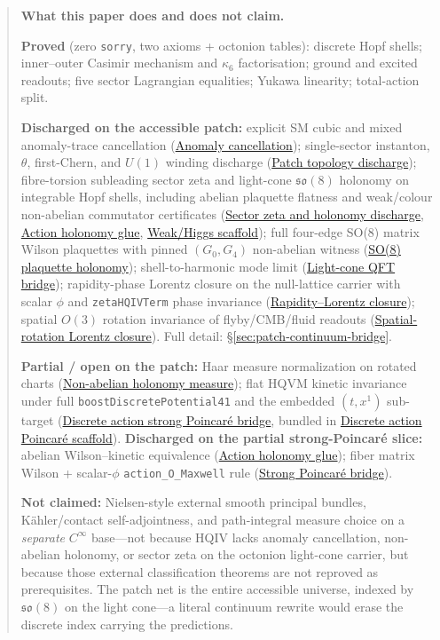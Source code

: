 \documentclass[11pt]{amsart}
\newenvironment{scopebox}{%
  \medskip\begin{quote}\small\noindent\textbf{What this paper does and does not claim.}
}{%
  \end{quote}\medskip
}
\begin{document}
\begin{scopebox}
\textbf{Proved} (zero \texttt{sorry}, two axioms + octonion tables): discrete Hopf shells; inner--outer Casimir mechanism and $\kappa_6$ factorisation; ground and excited readouts; five sector Lagrangian equalities; Yukawa linearity; total-action split.

\textbf{Discharged on the accessible patch:} explicit SM cubic and mixed anomaly-trace cancellation (\hyperref[lean:anomaly-cancellation]{Anomaly cancellation}); single-sector instanton, $\theta$, first-Chern, and $U(1)$ winding discharge (\hyperref[lean:patch-topology]{Patch topology discharge}); fibre-torsion subleading sector zeta and light-cone $\mathfrak{so}(8)$ holonomy on integrable Hopf shells, including abelian plaquette flatness and weak/colour non-abelian commutator certificates (\hyperref[lean:zeta-holonomy-discharge]{Sector zeta and holonomy discharge}, \hyperref[lean:action-holonomy-glue]{Action holonomy glue}, \hyperref[lean:weak-higgs-scaffold]{Weak/Higgs scaffold}); full four-edge SO(8) matrix Wilson plaquettes with pinned $(G_0,G_4)$ non-abelian witness (\hyperref[lean:so8-plaquette-holonomy]{SO(8) plaquette holonomy}); shell-to-harmonic mode limit (\hyperref[lean:lightcone-qft-bridge]{Light-cone QFT bridge}); rapidity-phase Lorentz closure on the null-lattice carrier with scalar $\phi$ and \texttt{zetaHQIVTerm} phase invariance (\hyperref[lean:rapidity-lorentz-closure]{Rapidity--Lorentz closure}); spatial $O(3)$ rotation invariance of flyby/CMB/fluid readouts (\hyperref[lean:spatial-rotation-lorentz-closure]{Spatial-rotation Lorentz closure}). Full detail: §\ref{sec:patch-continuum-bridge}.

\textbf{Partial / open on the patch:} Haar measure normalization on rotated charts (\hyperref[lean:non-abelian-holonomy-measure]{Non-abelian holonomy measure}); flat HQVM kinetic invariance under full \texttt{boostDiscretePotential41} and the embedded $(t,x^1)$ sub-target (\hyperref[lean:discrete-action-strong-poincare]{Discrete action strong Poincaré bridge}, bundled in \hyperref[lean:discrete-action-poincare]{Discrete action Poincaré scaffold}). \textbf{Discharged on the partial strong-Poincaré slice:} abelian Wilson--kinetic equivalence (\hyperref[lean:action-holonomy-glue]{Action holonomy glue}); fiber matrix Wilson + scalar-$\phi$ \texttt{action\_O\_Maxwell} rule (\hyperref[lean:discrete-action-strong-poincare]{Strong Poincaré bridge}).

\textbf{Not claimed:} Nielsen-style external smooth principal bundles, K\"ahler/contact self-adjointness, and path-integral measure choice on a \emph{separate} $C^\infty$ base---not because HQIV lacks anomaly cancellation, non-abelian holonomy, or sector zeta on the octonion light-cone carrier, but because those external classification theorems are not reproved as prerequisites. The patch net is the entire accessible universe, indexed by $\mathfrak{so}(8)$ on the light cone---a literal continuum rewrite would erase the discrete index carrying the predictions.


\end{scopebox}
\end{document}
